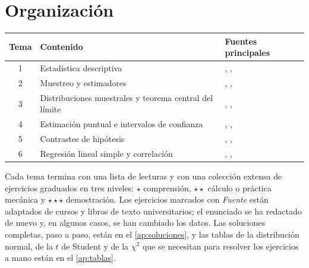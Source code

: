 \documentclass[11pt,a4paper,twoside,openany]{book}
\begin{document}
\section*{Organización}
\begin{center}
\small
\begin{tabular}{@{}cll@{}}
\toprule
Tema & Contenido & Fuentes principales \\
\midrule
1 & Estadística descriptiva & \cite{openstax}, \cite{rice}, \cite{mit1805} \\
2 & Muestreo y estimadores & \cite{wasserman}, \cite{bh}, \cite{stats200} \\
3 & Distribuciones muestrales y teorema central del límite & \cite{bh}, \cite{mit1805}, \cite{openstax} \\
4 & Estimación puntual e intervalos de confianza & \cite{mit1805}, \cite{wasserman}, \cite{stats200} \\
5 & Contrastes de hipótesis & \cite{mit1805}, \cite{wasserman}, \cite{stats200} \\
6 & Regresión lineal simple y correlación & \cite{openstax}, \cite{rice}, \cite{wasserman} \\
\bottomrule
\end{tabular}
\end{center}

Cada tema termina con una lista de lecturas y con una colección extensa de ejercicios graduados en tres niveles: $\star$ comprensión, $\star\star$ cálculo o práctica mecánica y $\star\star\star$ demostración. Los ejercicios marcados con \emph{Fuente} están adaptados de cursos y libros de texto universitarios; el enunciado se ha redactado de nuevo y, en algunos casos, se han cambiado los datos. Las soluciones completas, paso a paso, están en el \cref{ap:soluciones}, y las tablas de la distribución normal, de la $t$ de Student y de la $\chi^{2}$ que se necesitan para resolver los ejercicios a mano están en el \cref{ap:tablas}.
\end{document}
